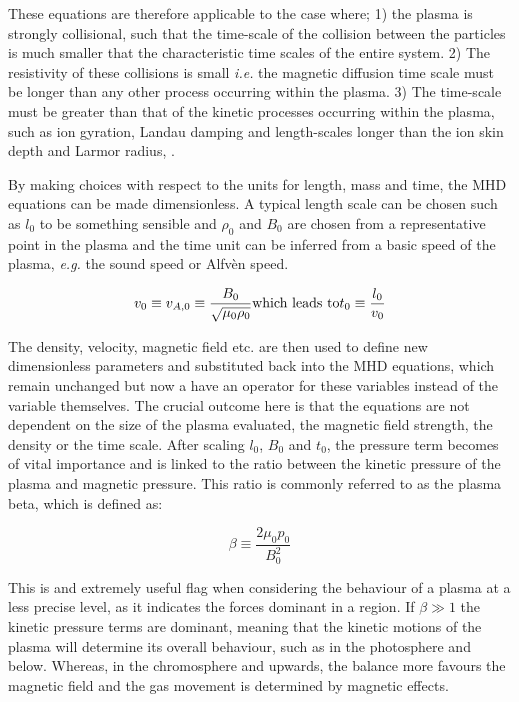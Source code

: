 \noindent These equations are therefore applicable to the case where; 1) the plasma is strongly collisional, such that the time-scale of the collision between the particles is much smaller that the characteristic time scales of the entire system.
2) The resistivity of these collisions is small \emph{i.e.} the magnetic diffusion time scale must be longer than any other process occurring within the plasma.
3) The time-scale must be greater than that of the kinetic processes occurring within the plasma, such as ion gyration, Landau damping and length-scales longer than the ion skin depth and Larmor radius, \cite{Goedbloed2004}.

By making choices with respect to the units for length, mass and time, the MHD equations can be made dimensionless.
A typical length scale can be chosen such as $l_0$ to be something sensible and $\rho_0$ and $B_0$ are chosen from a representative point in the plasma and the time unit can be inferred from a basic speed of the plasma, \emph{e.g.} the sound speed or Alfv{\`e}n speed.

\begin{equation}
	v_0 \equiv v_{A,0} \equiv \frac{B_0}{\sqrt{\mu_0\rho_0}} \textnormal{which leads to} t_0 \equiv \frac{l_0}{v_0} 
\end{equation}

\noindent The density, velocity, magnetic field etc. are then used to define new dimensionless parameters and substituted back into the MHD equations, which remain unchanged but now a have an operator for these variables instead of the variable themselves.
The crucial outcome here is that the equations are not dependent on the size of the plasma evaluated, the magnetic field strength, the density or the time scale.
After scaling $l_0$, $B_0$ and $t_0$, the pressure term becomes of vital importance and is linked to the ratio between the kinetic pressure of the plasma and magnetic pressure.
This ratio is commonly referred to as the plasma beta, which is defined as:

\begin{equation}
	\beta \equiv \frac{2\mu_0p_0}{B_0^2}
\end{equation} 

\noindent This is and extremely useful flag when considering the behaviour of a plasma at a less precise level, as it indicates the forces dominant in a region.
If $\beta \gg 1$ the kinetic pressure terms are dominant, meaning that the kinetic motions of the plasma will determine its overall behaviour, such as in the photosphere and below.
Whereas, in the chromosphere and upwards, the balance more favours the magnetic field and the gas movement is determined by magnetic effects.
 

